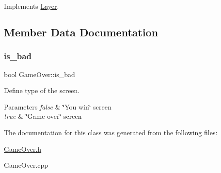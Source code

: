 Implements \hyperlink{class_layer_a41318993a0f6c7ba3bc6d964f7802c10}{Layer}.



\subsection{Member Data Documentation}
\mbox{\label{class_game_over_a4a7103cf4db129cad83b0c001c32d116}} 
\subsubsection{\texorpdfstring{is\+\_\+bad}{is\_bad}}
{\footnotesize\ttfamily bool Game\+Over\+::is\+\_\+bad\hspace{0.3cm}{\ttfamily [private]}}



Define type of the screen. 


\begin{DoxyParams}{Parameters}
{\em false} & \char`\"{}\+You win\char`\"{} screen \\
\hline
{\em true} & \char`\"{}\+Game over\char`\"{} screen \\
\hline
\end{DoxyParams}


The documentation for this class was generated from the following files\+:\begin{DoxyCompactItemize}
\item 
\hyperlink{_game_over_8h}{Game\+Over.\+h}\item 
Game\+Over.\+cpp\end{DoxyCompactItemize}
